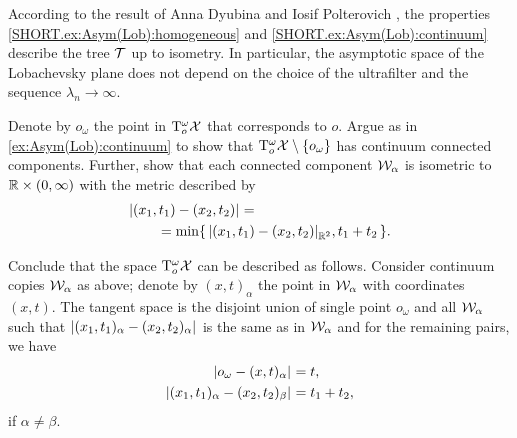 According to the result of Anna Dyubina and Iosif Polterovich \cite{dyubina-polterovich}, the properties \ref{SHORT.ex:Asym(Lob):homogeneous} and \ref{SHORT.ex:Asym(Lob):continuum} describe the tree $\mathcal{T}$ up to isometry.
In particular, the asymptotic space of the Lobachevsky plane does not depend on the choice of the ultrafilter and the sequence $\lambda_n\to \infty$.


Denote by $o_\omega$ the point in $\mathrm{T}^\omega_o\mathcal{X}$ that corresponds to $o$.
Argue as in \ref{ex:Asym(Lob):continuum} to show that $\mathrm{T}^\omega_o\mathcal{X}\setminus \{o_\omega\}$ has continuum connected components.
Further, show that each connected component $\mathcal{W}_\alpha$ is isometric to $\mathbb{R}\times (0,\infty)$ with the metric described by
\begin{align*}
&\dist{(x_1,t_1)}{(x_2,t_2)}{}=
\\
&\qquad=\min\{\,\dist{(x_1,t_1)}{(x_2,t_2)}{\RR^2},t_1+t_2\,\}.
\end{align*}

Conclude that the space $\mathrm{T}^\omega_o\mathcal{X}$ can be described as follows.
Consider continuum copies $\mathcal{W}_\alpha$ as above;
denote by $(x,t)_\alpha$ the point in $\mathcal{W}_\alpha$ with coordinates $(x,t)$.
The tangent space is the disjoint union of single point $o_\omega$ and all $\mathcal{W}_\alpha$ 
such that $\dist{(x_1,t_1)_\alpha}{(x_2,t_2)_\alpha}{}$ is the same as in $\mathcal{W}_\alpha$ and for the remaining pairs, we have
\begin{align*}
\dist{o_\omega}{(x,t)_\alpha}{}&=t,
\\
\dist{(x_1,t_1)_\alpha}{(x_2,t_2)_\beta}{}&=t_1+t_2,
\end{align*}
if $\alpha\ne\beta$.
